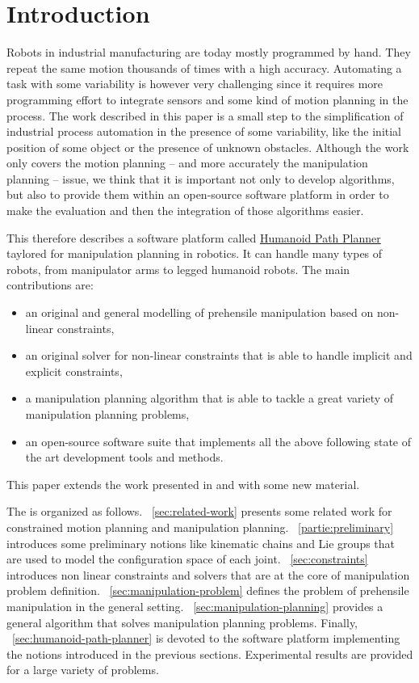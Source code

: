 \section{Introduction}

Robots in industrial manufacturing are today mostly programmed by
hand. They repeat the same motion thousands of times with a high
accuracy. Automating a task with some variability is however very
challenging since it requires more programming effort to integrate
sensors and some kind of motion planning in the process. The work
described in this paper is a small step to the simplification of
industrial process automation in the presence of some variability,
like the initial position of some object or the presence of unknown
obstacles. Although the work only covers the motion planning -- and
more accurately the manipulation planning -- issue, we think that it
is important not only to develop algorithms, but also to provide them
within an open-source software platform in order to make the
evaluation and then the integration of those algorithms easier.

This \paper therefore describes a software platform called \href{https://humanoid-path-planner.github.io/hpp-doc}{Humanoid Path
  Planner} taylored for manipulation planning in robotics. It can handle many types of robots, from manipulator arms to legged humanoid robots.
The main contributions are:
\begin{itemize}
\item an original and general modelling of prehensile manipulation based on
  non-linear constraints,
\item an original solver for non-linear constraints that is able to handle implicit and explicit constraints,
\item a manipulation planning algorithm that is able to tackle a great variety of manipulation planning problems,
\item an open-source software suite that implements all the above following state of the art development tools and methods.
\end{itemize}

This paper extends the work presented in \cite{mirabel-iros2016} and \cite{MirLam2018} with some new material.

The \paper is organized as follows. \Partie~\ref{sec:related-work} presents some related work for constrained motion planning and manipulation planning.
\Partie~\ref{partie:preliminary} introduces some preliminary notions like kinematic chains and Lie groups that are used to model the configuration space of each joint. \Partie~\ref{sec:constraints} introduces non linear constraints and solvers that are at the core of manipulation problem definition. \Partie~\ref{sec:manipulation-problem} defines the problem of prehensile manipulation in the general setting. \Partie~\ref{sec:manipulation-planning} provides a general algorithm that solves manipulation planning problems. Finally, \partie~\ref{sec:humanoid-path-planner} is devoted to the software platform implementing the notions introduced in the previous sections. Experimental results are provided for a large variety of problems.

